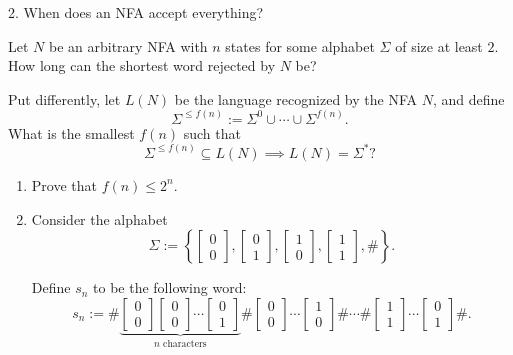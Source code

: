 \documentclass[12pt]{article}
\begin{document}
\begin{problem}{2. When does an NFA accept everything?}

    Let $N$ be an arbitrary NFA with $n$ states for some alphabet $\Sigma$ of size at least $2$. How long can the shortest word rejected by $N$ be?

    Put differently, let $L(N)$ be the language recognized by the NFA $N$, and define
    \[
    \Sigma^{\le f(n)} := \Sigma^0 \cup \cdots \cup \Sigma^{f(n)}.
    \]
    What is the smallest $f(n)$ such that
    \[
    \Sigma^{\le f(n)} \subseteq L(N) \implies L(N) = \Sigma^*?
    \]

    \begin{enumerate}
    \item [(a)] Prove that $f(n) \le 2^n$.

    \item [(b)] Consider the alphabet
    \[
    \Sigma := \left\{
    \begin{bmatrix}0\\0\end{bmatrix},
    \begin{bmatrix}0\\1\end{bmatrix},
    \begin{bmatrix}1\\0\end{bmatrix},
    \begin{bmatrix}1\\1\end{bmatrix},
    \#
    \right\}.
    \]

    Define $s_n$ to be the following word:
    \[
    s_n := \# \underbrace{ 
    \begin{bmatrix}0\\0\end{bmatrix}
    \begin{bmatrix}0\\0\end{bmatrix}
    \cdots
    \begin{bmatrix}0\\1\end{bmatrix}}_{n \text{ characters}}
    \# 
    \begin{bmatrix}0\\0\end{bmatrix}
    \cdots
    \begin{bmatrix}1\\0\end{bmatrix}
    \# 
    \cdots 
    \#
    \begin{bmatrix}1\\1\end{bmatrix}
    \cdots
    \begin{bmatrix}0\\1\end{bmatrix}
    \#.
    \]


\end{enumerate}
\end{problem}
\end{document}
